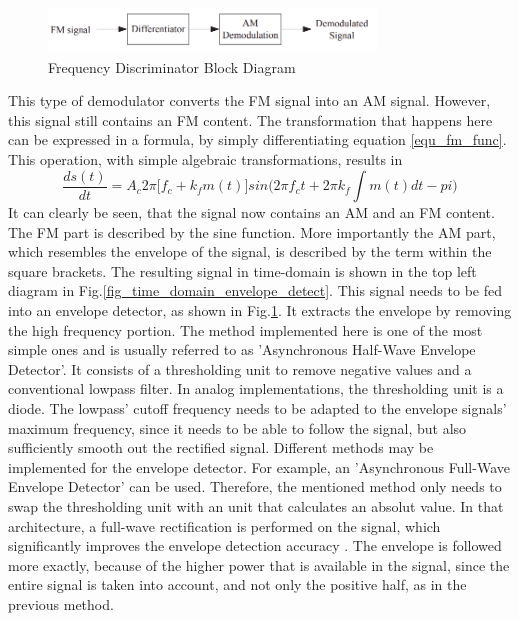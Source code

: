 \documentclass[conference]{IEEEtran}
\begin{document}
    \begin{figure}[!h]
      \centering
        \includegraphics[width=8.7cm]{img/discrimination_method_bd2.png}
      \caption{Frequency Discriminator Block Diagram \cite{ref_fig_freq_discriminator}}
      \label{fig_freq_discriminator_bd}
    \end{figure}

    This type of demodulator converts the FM signal into an AM signal.
    However, this signal still contains an FM content.
    The transformation that happens here can be expressed in a formula, by simply differentiating equation \ref{equ_fm_func}.
    This operation, with simple algebraic transformations, results in
    \begin{equation}
      \frac{d s(t)}{dt} = A_c 2 \pi \Big[f_c + k_f m(t) \Big] sin \Big(2 \pi f_c t + 2 \pi k_f \int m(t) dt -pi \Big)
    \end{equation}
    It can clearly be seen, that the signal now contains an AM and an FM content.
    The FM part is described by the sine function.
    More importantly the AM part, which resembles the envelope of the signal, is described by the term within the square brackets.
    The resulting signal in time-domain is shown in the top left diagram in Fig.\ref{fig_time_domain_envelope_detect}.
    This signal needs to be fed into an envelope detector, as shown in Fig.\ref{fig_freq_discriminator_bd}.
    It extracts the envelope by removing the high frequency portion.
    The method implemented here is one of the most simple ones and is usually referred to as 'Asynchronous Half-Wave Envelope Detector'\cite{ref_envelope_detector}.
    It consists of a thresholding unit to remove negative values and a conventional lowpass filter.
    In analog implementations, the thresholding unit is a diode.
    The lowpass' cutoff frequency needs to be adapted to the envelope signals' maximum frequency, since it needs to be able to follow the signal, but also sufficiently smooth out the rectified signal.
    Different methods may be implemented for the envelope detector.
    For example, an 'Asynchronous Full-Wave Envelope Detector' can be used.
    Therefore, the mentioned method only needs to swap the thresholding unit with an unit that calculates an absolut value.
    In that architecture, a full-wave rectification is performed on the signal, which significantly improves the envelope detection accuracy \cite{ref_envelope_detector}.
    The envelope is followed more exactly, because of the higher power that is available in the signal, since the entire signal is taken into account, and not only the positive half, as in the previous method.
\end{document}
